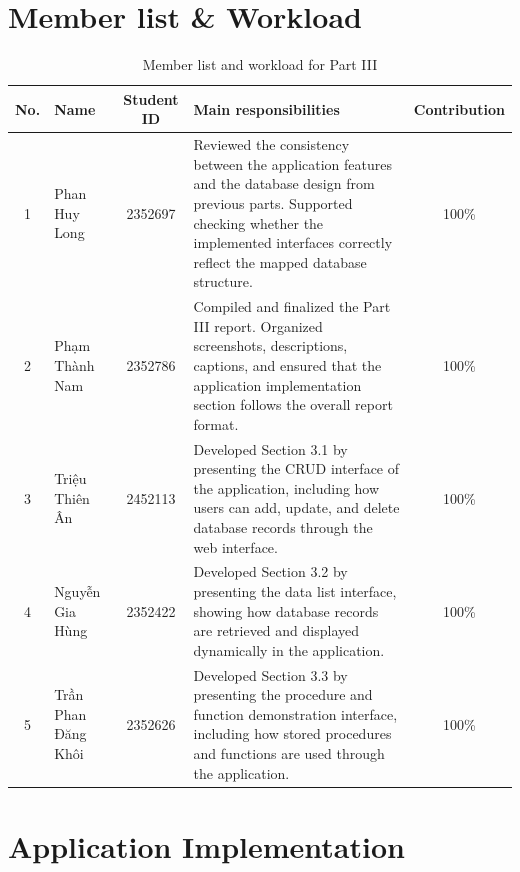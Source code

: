 \documentclass[twoside]{hcmut-report}
\begin{document}
\section*{Member list \& Workload}
\begin{table}[h]
\centering
\small
\begin{tabular}{|c|l|c|p{7cm}|c|}
\hline
\textbf{No.} & \textbf{Name} & \textbf{Student ID} &
\textbf{Main responsibilities} & \textbf{Contribution} \\
\hline

1 & Phan Huy Long & 2352697 &
Reviewed the consistency between the application features and the database design from previous parts. 
Supported checking whether the implemented interfaces correctly reflect the mapped database structure. 
& 100\% \\
\hline

2 & Phạm Thành Nam & 2352786 &
Compiled and finalized the Part III report. 
Organized screenshots, descriptions, captions, and ensured that the application implementation section follows the overall report format. 
& 100\% \\
\hline

3 & Triệu Thiên Ân & 2452113 &
Developed Section 3.1 by presenting the CRUD interface of the application, including how users can add, update, and delete database records through the web interface. 
& 100\% \\
\hline

4 & Nguyễn Gia Hùng & 2352422 &
Developed Section 3.2 by presenting the data list interface, showing how database records are retrieved and displayed dynamically in the application. 
& 100\% \\
\hline

5 & Trần Phan Đăng Khôi & 2352626 &
Developed Section 3.3 by presenting the procedure and function demonstration interface, including how stored procedures and functions are used through the application. 
& 100\% \\
\hline

\end{tabular}
\caption{Member list and workload for Part III}
\label{tab:member-workload-part3}
\end{table}
\clearpage
 
\tableofcontents

\clearpage

\section{Application Implementation}




\end{document}
